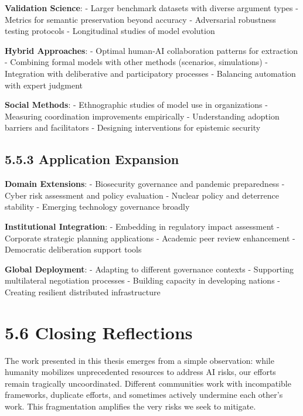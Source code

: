\documentclass[
  11pt,
  letterpaper,
]{book}
\begin{document}
\textbf{Validation Science}: - Larger benchmark datasets with diverse
argument types - Metrics for semantic preservation beyond accuracy -
Adversarial robustness testing protocols - Longitudinal studies of model
evolution

\textbf{Hybrid Approaches}: - Optimal human-AI collaboration patterns
for extraction - Combining formal models with other methods (scenarios,
simulations) - Integration with deliberative and participatory processes
- Balancing automation with expert judgment

\textbf{Social Methods}: - Ethnographic studies of model use in
organizations - Measuring coordination improvements empirically -
Understanding adoption barriers and facilitators - Designing
interventions for epistemic security

\subsection*{5.5.3 Application
Expansion}\label{sec-application-expansion}

\textbf{Domain Extensions}: - Biosecurity governance and pandemic
preparedness - Cyber risk assessment and policy evaluation - Nuclear
policy and deterrence stability - Emerging technology governance broadly

\textbf{Institutional Integration}: - Embedding in regulatory impact
assessment - Corporate strategic planning applications - Academic peer
review enhancement - Democratic deliberation support tools

\textbf{Global Deployment}: - Adapting to different governance contexts
- Supporting multilateral negotiation processes - Building capacity in
developing nations - Creating resilient distributed infrastructure

\section*{5.6 Closing Reflections}\label{sec-closing-reflections}


The work presented in this thesis emerges from a simple observation:
while humanity mobilizes unprecedented resources to address AI risks,
our efforts remain tragically uncoordinated. Different communities work
with incompatible frameworks, duplicate efforts, and sometimes actively
undermine each other's work. This fragmentation amplifies the very risks
we seek to mitigate.
\end{document}
